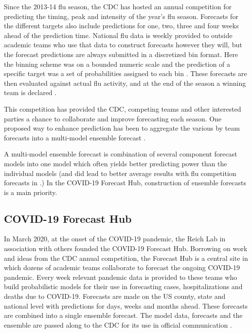 \documentclass{article}\usepackage[]{graphicx}\usepackage[]{color}
\begin{document}
Since the 2013-14 flu season, the CDC has hosted an annual competition for 
predicting the timing, peak and intensity of the year's flu season. Forecasts
for the different targets also include predictions for one, two, three and 
four weeks ahead of the prediction time. National flu data is weekly provided 
to outside academic teams who use that data to construct forecasts however they
will, but the forecast predictions are always submitted in a discretized bin
format. Here the binning scheme was on a bounded numeric scale and the 
prediction of a specific target was a set of probabilities assigned to each bin
\cite{mcgowan2019collaborative}.
These forecasts are then evaluated against actual flu activity, and at 
the end of the season a winning team is declared \cite{cdcflusight}.

This competition has provided the CDC, competing teams and other interested
parties a chance to collaborate and improve forecasting each season. One 
proposed way to enhance prediction has been to aggregate the various by team
forecasts into a multi-model ensemble forecast \cite{mcgowan2019collaborative}
\cite{mcandrew2019adaptively} \cite{reich2019accuracy}.

A multi-model ensemble forecast is combination of several component forecast 
models into one model which often yields better predicting power than the 
individual models \cite{cramer2021evaluation} (and did lead to better average 
results with flu competition forecasts in \cite{reich2019accuracy}.) 
In the COVID-19 Forecast Hub, construction of ensemble forecasts is a main
priority.




\subsection{COVID-19 Forecast Hub}
In March 2020, at the onset of the COVID-19 pandemic, the Reich Lab in
association with others founded the COVID-19 Forecast Hub. Borrowing on work and 
ideas from the CDC annual competition, the Forecast Hub is a central site in 
which dozens of academic teams collaborate to forecast the ongoing COVID-19 
pandemic.
Every week relevant
pandemic data is provided to these teams who build probabilistic models for 
their use in
forecasting cases, hospitalizations and deaths due to COVID-19. Forecasts are 
made on the US county,
state and national level with predictions for days, weeks and months ahead.
These forecasts are combined into a single ensemble forecast. The model data,
forecasts and the ensemble are passed along to the CDC for its use in official
communication \cite{Cramer2021-hub-dataset}.
\end{document}
